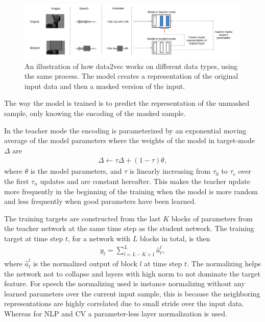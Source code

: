 \begin{figure}
    \centering
    \includegraphics[width=\textwidth]{incl/img/data2vec/data2vec_ilu.png}
    \caption{An illustration of how data2vec works on different data types, using the same process. The model creates a representation of the original input data and then a masked version of the input.}
    \label{fig:data2vec_ilu}
\end{figure}


The way the model is trained is to predict the representation of the unmasked sample, only knowing the encoding of the masked sample.

In the teacher mode the encoding is parameterized by an exponential moving average of the model parameters where the weights of the model in target-mode \(\Delta\) are
\begin{align}
    \Delta \leftarrow \tau \Delta + (1-\tau)\theta,
\end{align}
where \(\theta\) is the model parameters, and \(\tau\) is linearly increasing from \(\tau_0\) to \(\tau_e\) over the first \(\tau_n\) updates and are constant hereafter. This makes the teacher update more frequently in the beginning of the training when the model is more random and less frequently when good parameters have been learned.

The training targets are constructed from the last \(K\) blocks of parameters from the teacher network at the same time step as the student network. The training target at time step \(t\), for a network with \(L\) blocks in total, is then
\begin{align}
    y_t = \sum_{l=L-K+1}^L \hat{a}_t^l,
\end{align}
where \(\hat{a}_t^l\) is the normalized output of block \(l\) at time step \(t\). The normalizing helps the network not to collapse and layers with high norm to not dominate the target feature. For speech the normalizing used is instance normalizing \cite{ulyanov2016instance} without any learned parameters over the current input sample, this is because the neighboring representations are highly correlated due to small stride over the input data. Whereas for NLP and CV a parameter-less layer normalization \cite{ba2016layer} is used. 
